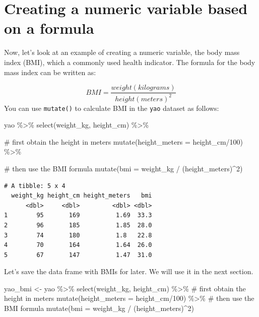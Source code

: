 \documentclass[
  letterpaper,
  DIV=11,
  numbers=noendperiod]{scrreprt}
\newenvironment{Shaded}{\begin{snugshade}}{\end{snugshade}}
\newcommand{\AttributeTok}[1]{\textcolor[rgb]{0.40,0.45,0.13}{#1}}
\newcommand{\CommentTok}[1]{\textcolor[rgb]{0.37,0.37,0.37}{#1}}
\newcommand{\DecValTok}[1]{\textcolor[rgb]{0.68,0.00,0.00}{#1}}
\newcommand{\FunctionTok}[1]{\textcolor[rgb]{0.28,0.35,0.67}{#1}}
\newcommand{\NormalTok}[1]{\textcolor[rgb]{0.00,0.23,0.31}{#1}}
\newcommand{\OtherTok}[1]{\textcolor[rgb]{0.00,0.23,0.31}{#1}}
\newcommand{\SpecialCharTok}[1]{\textcolor[rgb]{0.37,0.37,0.37}{#1}}
\begin{document}
\hypertarget{creating-a-numeric-variable-based-on-a-formula}{%
\section{Creating a numeric variable based on a
formula}\label{creating-a-numeric-variable-based-on-a-formula}}

Now, let's look at an example of creating a numeric variable, the body
mass index (BMI), which a commonly used health indicator. The formula
for the body mass index can be written as:

\[
BMI = \frac{weight (kilograms)}{height (meters)^2}
\] You can use \texttt{mutate()} to calculate BMI in the \texttt{yao}
dataset as follows:

\begin{Shaded}
\begin{Highlighting}[]
\NormalTok{yao }\SpecialCharTok{\%\textgreater{}\%}
  \FunctionTok{select}\NormalTok{(weight\_kg,  height\_cm) }\SpecialCharTok{\%\textgreater{}\%} 
  
  \CommentTok{\# first obtain the height in meters  }
  \FunctionTok{mutate}\NormalTok{(}\AttributeTok{height\_meters =}\NormalTok{ height\_cm}\SpecialCharTok{/}\DecValTok{100}\NormalTok{) }\SpecialCharTok{\%\textgreater{}\%} 
  
  \CommentTok{\# then use the BMI formula}
  \FunctionTok{mutate}\NormalTok{(}\AttributeTok{bmi =}\NormalTok{ weight\_kg }\SpecialCharTok{/}\NormalTok{ (height\_meters)}\SpecialCharTok{\^{}}\DecValTok{2}\NormalTok{)}
\end{Highlighting}
\end{Shaded}

\begin{verbatim}
# A tibble: 5 x 4
  weight_kg height_cm height_meters   bmi
      <dbl>     <dbl>         <dbl> <dbl>
1        95       169          1.69  33.3
2        96       185          1.85  28.0
3        74       180          1.8   22.8
4        70       164          1.64  26.0
5        67       147          1.47  31.0
\end{verbatim}

Let's save the data frame with BMIs for later. We will use it in the
next section.

\begin{Shaded}
\begin{Highlighting}[]
\NormalTok{yao\_bmi }\OtherTok{\textless{}{-}} 
\NormalTok{  yao }\SpecialCharTok{\%\textgreater{}\%}
  \FunctionTok{select}\NormalTok{(weight\_kg,  height\_cm) }\SpecialCharTok{\%\textgreater{}\%} 
  \CommentTok{\# first obtain the height in meters  }
  \FunctionTok{mutate}\NormalTok{(}\AttributeTok{height\_meters =}\NormalTok{ height\_cm}\SpecialCharTok{/}\DecValTok{100}\NormalTok{) }\SpecialCharTok{\%\textgreater{}\%} 
  \CommentTok{\# then use the BMI formula}
  \FunctionTok{mutate}\NormalTok{(}\AttributeTok{bmi =}\NormalTok{ weight\_kg }\SpecialCharTok{/}\NormalTok{ (height\_meters)}\SpecialCharTok{\^{}}\DecValTok{2}\NormalTok{)}
\end{Highlighting}
\end{Shaded}
\end{document}
